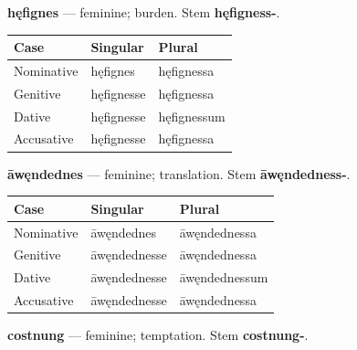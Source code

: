 \textbf{hęfignes} — feminine; burden. Stem \textbf{hęfigness-}.

\par\begingroup
\fontsize{10.5}{13.2}\selectfont
\setlength{\LTleft}{0pt}\setlength{\LTright}{\fill}
\noindent
\begin{tabular}{@{}>{\raggedright\arraybackslash}p{38.19mm}>{\raggedright\arraybackslash}p{38.19mm}>{\raggedright\arraybackslash}p{42.0mm}@{}}
\toprule
\textbf{Case} & \textbf{Singular} & \textbf{Plural} \\
\midrule
Nominative & hęfignes & hęfignessa \\
Genitive & hęfignesse & hęfignessa \\
Dative & hęfignesse & hęfignessum \\
Accusative & hęfignesse & hęfignessa \\
\bottomrule
\end{tabular}
\par\endgroup

\textbf{āwęndednes} — feminine; translation. Stem \textbf{āwęndedness-}.

\par\begingroup
\fontsize{10.5}{13.2}\selectfont
\setlength{\LTleft}{0pt}\setlength{\LTright}{\fill}
\noindent
\begin{tabular}{@{}>{\raggedright\arraybackslash}p{33.82mm}>{\raggedright\arraybackslash}p{40.59mm}>{\raggedright\arraybackslash}p{43.97mm}@{}}
\toprule
\textbf{Case} & \textbf{Singular} & \textbf{Plural} \\
\midrule
Nominative & āwęndednes & āwęndednessa \\
Genitive & āwęndednesse & āwęndednessa \\
Dative & āwęndednesse & āwęndednessum \\
Accusative & āwęndednesse & āwęndednessa \\
\bottomrule
\end{tabular}
\par\endgroup

\textbf{costnung} — feminine; temptation. Stem \textbf{costnung-}.

